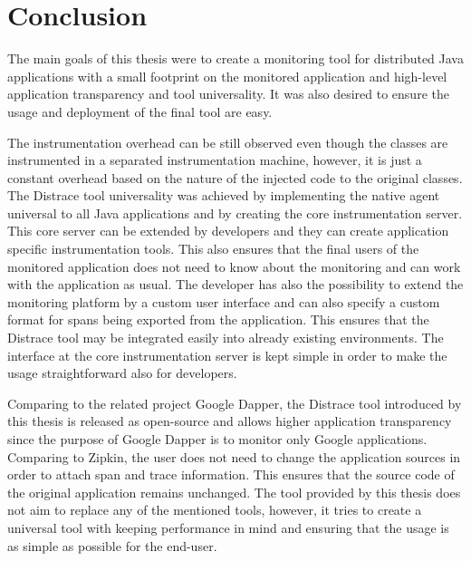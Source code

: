 \chapter{Conclusion}
The main goals of this thesis were to create a monitoring tool for distributed Java applications with a small footprint on the monitored application and high-level application transparency and tool universality. It was also desired to ensure the usage and deployment of the final tool are easy. 

The instrumentation overhead can be still observed even though the classes are instrumented in a separated instrumentation machine, however, it is just a constant overhead based on the nature of the injected code to the original classes. The Distrace tool universality was achieved by implementing the native agent universal to all Java applications and by creating the core instrumentation server. This core server can be extended by developers and they can create application specific instrumentation tools. This also ensures that the final users of the monitored application does not need to know about the monitoring and can work with the application as usual. The developer has also the possibility to extend the monitoring platform by a custom user interface and can also specify a custom format for spans being exported from the application. This ensures that the Distrace tool may be integrated easily into already existing environments. The interface at the core instrumentation server is kept simple in order to make the usage straightforward also for developers.

Comparing to the related project Google Dapper, the Distrace tool introduced by this thesis is released as open-source and allows higher application transparency since the purpose of Google Dapper is to monitor only Google applications. Comparing to Zipkin, the user does not need to change the application sources in order to attach span and trace information. This ensures that the source code of the original application remains unchanged. The tool provided by this thesis does not aim to replace any of the mentioned tools, however, it tries to create a universal tool with keeping performance in mind and ensuring that the usage is as simple as possible for the end-user.


